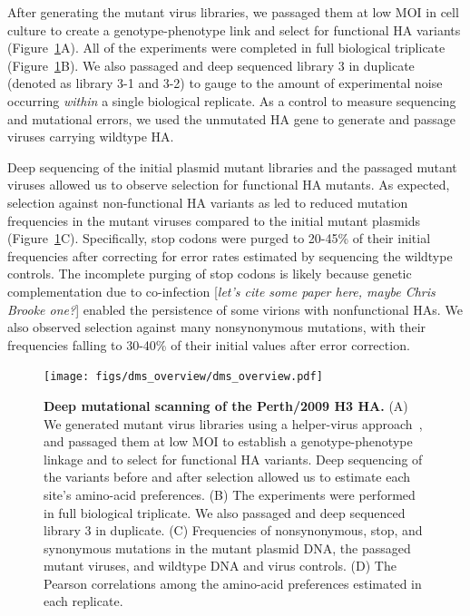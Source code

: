 \documentclass[9pt,twocolumn,twoside]{pnas-new}
\newcommand{\comment}[1]{{\color{red}[\textsl{#1}]}}
\begin{document}
After generating the mutant virus libraries, we passaged them at low MOI in cell culture to create a genotype-phenotype link and select for functional HA variants (Figure~\ref{fig:dms_overview}A).
All of the experiments were completed in full biological triplicate (Figure~\ref{fig:dms_overview}B). 
We also passaged and deep sequenced library 3 in duplicate (denoted as library 3-1 and 3-2) to gauge to the amount of experimental noise occurring \textit{within} a single biological replicate.
As a control to measure sequencing and mutational errors, we used the unmutated HA gene to generate and passage viruses carrying wildtype HA.

Deep sequencing of the initial plasmid mutant libraries and the passaged mutant viruses allowed us to observe selection for functional HA mutants.
As expected, selection against non-functional HA variants as led to reduced mutation frequencies in the mutant viruses compared to the initial mutant plasmids (Figure~\ref{fig:dms_overview}C).
Specifically, stop codons were purged to 20-45\% of their initial frequencies after correcting for error rates estimated by sequencing the wildtype controls.
The incomplete purging of stop codons is likely because genetic complementation due to co-infection \comment{let's cite some paper here, maybe Chris Brooke one?} enabled the persistence of some virions with nonfunctional HAs. 
We also observed selection against many nonsynonymous mutations, with their frequencies falling to 30-40\% of their initial values after error correction.

\begin{figure}
\centering
\texttt{[image: figs/dms\_overview/dms\_overview.pdf]}
\caption{\label{fig:dms_overview}
{\bf Deep mutational scanning of the Perth/2009 H3 HA.}
(A) We generated mutant virus libraries using a helper-virus approach~\cite{doud2016accurate}, and passaged them at low MOI to establish a genotype-phenotype linkage and to select for functional HA variants. 
Deep sequencing of the variants before and after selection allowed us to estimate each site's amino-acid preferences.
(B) The experiments were performed in full biological triplicate. 
We also passaged and deep sequenced library 3 in duplicate.
(C) Frequencies of nonsynonymous, stop, and synonymous mutations in the mutant plasmid DNA, the passaged mutant viruses, and wildtype DNA and virus controls. 
(D) The Pearson correlations among the amino-acid preferences estimated in each replicate. 
}
\end{figure}
\end{document}
